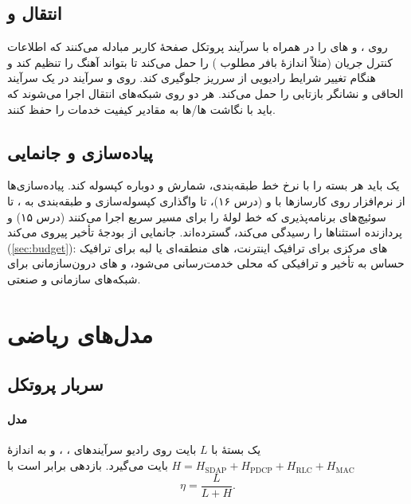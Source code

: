\documentclass[11pt,a4paper]{article}
\begin{document}
\subsection{انتقال  و }
روی ،  و  های  را در  همراه با سرآیند پروتکل صفحهٔ کاربر  مبادله می‌کنند که
اطلاعات کنترل جریان (مثلاً اندازهٔ بافر مطلوب ) را حمل می‌کند تا  بتواند آهنگ  را تنظیم کند و هنگام تغییر شرایط
رادیویی از سرریز جلوگیری کند. روی  و  سرآیند  در یک سرآیند الحاقی  و نشانگر  بازتابی را حمل
می‌کند. هر دو روی شبکه‌های انتقال  اجرا می‌شوند که باید با نگاشت ها/ها به مقادیر  کیفیت خدمات را حفظ کنند.

\subsection{پیاده‌سازی و جانمایی }
یک  باید هر بسته را با نرخ خط طبقه‌بندی، شمارش و دوباره کپسوله کند. پیاده‌سازی‌ها از نرم‌افزار روی کارسازها با  و
 (درس ۱۶)، تا واگذاری کپسوله‌سازی و طبقه‌بندی به ، تا سوئیچ‌های برنامه‌پذیری که خط لولهٔ  را برای مسیر سریع
اجرا می‌کنند (درس ۱۵) و پردازنده استثناها را رسیدگی می‌کند، گسترده‌اند. جانمایی از بودجهٔ تأخیر پیروی می‌کند (\cref{sec:budget}): های
مرکزی برای ترافیک اینترنت، های منطقه‌ای یا لبه برای ترافیک حساس به تأخیر و ترافیکی که محلی خدمت‌رسانی می‌شود، و های
درون‌سازمانی برای شبکه‌های سازمانی و صنعتی.

\section{مدل‌های ریاضی}

\subsection{سربار پروتکل}\label{sec:oh}
\paragraph{مدل} یک بستهٔ  با $L$ بایت روی رادیو سرآیندهای ، ،  و  به اندازهٔ
$H = H_{\mathrm{SDAP}} + H_{\mathrm{PDCP}} + H_{\mathrm{RLC}} + H_{\mathrm{MAC}}$ بایت می‌گیرد. بازدهی برابر است با
\begin{equation}\label{eq:overhead}
  \eta = \frac{L}{L + H} .
\end{equation}
\end{document}
